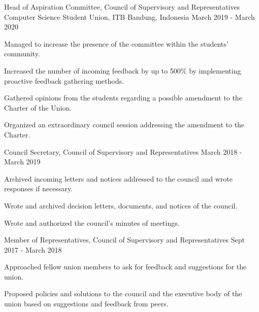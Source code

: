 

\begin{cventries}
\cventry
{Head of Aspiration Committee, Council of Supervisory and Representatives} %
{Computer Science Student Union, ITB} %
{Bandung, Indonesia} %
{March 2019 - March 2020} %
{
	\begin{cvitems} %
		\item {Managed to increase the presence of the committee within the students' community.}
		\item {Increased the number of incoming feedback by up to 500\% by implementing proactive feedback gathering methods.}
		\item {Gathered opinions from the students regarding a possible amendment to the Charter of the Union.}
		\item {Organized an extraordinary council session addressing the amendment to the Charter.}
	\end{cvitems}
}

\cventry
{Council Secretary, Council of Supervisory and Representatives} %
{} %
{} %
{March 2018 - March 2019} %
{
	\begin{cvitems} %
		\item {Archived incoming letters and notices addressed to the council and wrote responses if necessary.}
		\item {Wrote and archived decision letters, documents, and notices of the council.}
		\item {Wrote and authorized the council's minutes of meetings.}
	\end{cvitems}
}

\cventry
{Member of Representatives, Council of Supervisory and Representatives} %
{} %
{} %
{Sept 2017 - March 2018} %
{
	\begin{cvitems} %
		\item {Approached fellow union members to ask for feedback and suggestions for the union.}
		\item {Proposed policies and solutions to the council and the executive body of the union based on suggestions and feedback from peers.}
	\end{cvitems}
}


\end{cventries}
